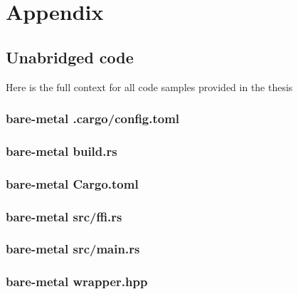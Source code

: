 \chapter{Appendix}
\label{chap:appendix}

\section{Unabridged code}

Here is the full context for all code samples provided in the thesis

\subsection{bare-metal .cargo/config.toml}
\label{sec:appendix:code:bare-metal:config}



\subsection{bare-metal build.rs}
\label{sec:appendix:code:bare-metal:build}



\subsection{bare-metal Cargo.toml}
\label{sec:appendix:code:bare-metal:cargo}



\subsection{bare-metal src/ffi.rs}
\label{sec:appendix:code:bare-metal:ffi}



\subsection{bare-metal src/main.rs}
\label{sec:appendix:code:bare-metal:main}



\subsection{bare-metal wrapper.hpp}
\label{sec:appendix:code:bare-metal:wrapper}

